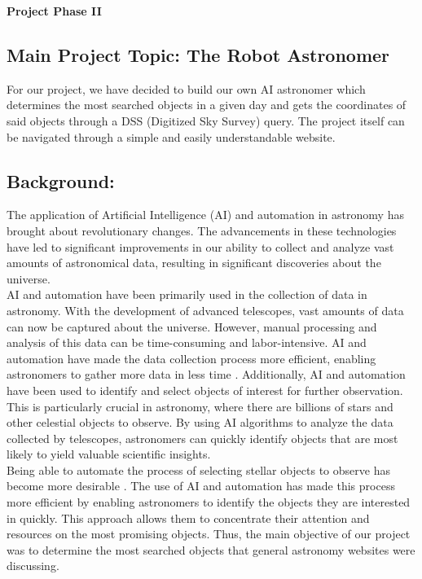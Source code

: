 \documentclass[12pt,letterpaper]{article}
\begin{document}
  \thispagestyle{firstpagestyle}
  \begin{center}
    {\huge \textbf{Project Phase II}}
  \end{center}
    
\subsection*{Main Project Topic: The Robot Astronomer}
\quad For our project, we have decided to build our own AI astronomer which determines the most 
searched objects in a given day and gets the coordinates of said objects through a DSS (Digitized 
Sky Survey) query. The project itself can be navigated through a simple and easily understandable 
website. \\
\subsection*{Background:}
\quad The application of Artificial Intelligence (AI) and automation in astronomy has brought 
about revolutionary changes. The advancements in these technologies have led to significant 
improvements in our ability to collect and analyze vast amounts of astronomical data, resulting 
in significant discoveries about the universe. \\

\quad AI and automation have been primarily used in the collection of data in astronomy. With the 
development of advanced telescopes, vast amounts of data can now be captured about the 
universe. However, manual processing and analysis of this data can be time-consuming and 
labor-intensive. AI and automation have made the data collection process more efficient, enabling 
astronomers to gather more data in less time \cite{Spindler}. Additionally, AI and automation have been used to 
identify and select objects of interest for further observation. This is particularly crucial in 
astronomy, where there are billions of stars and other celestial objects to observe. By using AI 
algorithms to analyze the data collected by telescopes, astronomers can quickly identify 
objects that are most likely to yield valuable scientific insights. \\

\quad Being able to automate the process of selecting stellar objects to observe has become more desirable \cite{Ananthaswamy}. The 
use of AI and automation has made this process more efficient by enabling astronomers to identify 
the objects they are interested in quickly. This approach allows them to concentrate their attention 
and resources on the most promising objects. Thus, the main objective of our project was to 
determine the most searched objects that general astronomy websites were discussing.  \\
\end{document}

